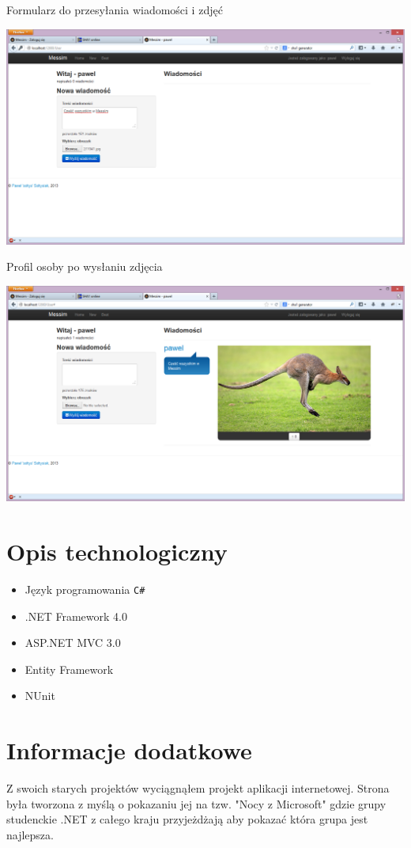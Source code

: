 \documentclass{article}
\begin{document}
Formularz do przesyłania wiadomości i zdjęć

\includegraphics[width=\textwidth]{screenshots/posting_first_image}

Profil osoby po wysłaniu zdjęcia

\includegraphics[width=\textwidth]{screenshots/posted_first_image}

\section{Opis technologiczny}
\begin{itemize}
\item Język programowania \texttt{C\#}
\item .NET Framework 4.0
\item ASP.NET MVC 3.0
\item Entity Framework
\item NUnit
\end{itemize}
\section{Informacje dodatkowe}

Z swoich starych projektów wyciągnąłem projekt aplikacji internetowej. Strona była tworzona z myślą o pokazaniu jej na tzw. "Nocy z Microsoft" gdzie grupy studenckie .NET z całego kraju przyjeżdżają aby pokazać która grupa jest najlepsza.
\end{document}
